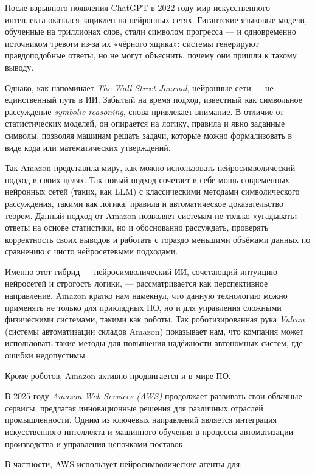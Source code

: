 После взрывного появления ChatGPT в 2022 году мир искусственного интеллекта оказался зациклен на нейронных сетях. Гигантские языковые модели, обученные на триллионах слов, стали символом прогресса — и одновременно источником тревоги из-за их «чёрного ящика»: системы генерируют правдоподобные ответы, но не могут объяснить, почему они пришли к такому выводу.

Однако, как напоминает \textit{The Wall Street Journal}, нейронные сети — не единственный путь в ИИ. Забытый на время подход, известный как символьное рассуждение \textit{symbolic reasoning}, снова привлекает внимание. В отличие от статистических моделей, он опирается на логику, правила и явно заданные символы, позволяя машинам решать задачи, которые можно формализовать в виде кода или математических утверждений.

Так Amazon представила миру, как можно использовать нейросимволический подход в своих целях. Так новый подход сочетает в себе мощь современных нейронных сетей (таких, как LLM) с классическими методами символического рассуждения, такими как логика, правила и автоматическое доказательство теорем. Данный подход от Amazon позволяет системам не только «угадывать» ответы на основе статистики, но и обоснованно рассуждать, проверять корректность своих выводов и работать с гораздо меньшими объёмами данных по сравнению с чисто нейросетевыми подходами.

Именно этот гибрид — нейросимволический ИИ, сочетающий интуицию нейросетей и строгость логики, — рассматривается как перспективное направление. Amazon кратко нам намекнул, что данную технологию можно применять не только для прикладных ПО, но и для управления сложными физическими системами, такими как роботы. Так роботизированная рука \textit{Vulcan} (системы автоматизации складов Amazon) показывает нам, что компания может использовать такие методы для повышения надёжности автономных систем, где ошибки недопустимы.

Кроме роботов, Amazon активно продвигается и в мире ПО.

В 2025 году \textit{Amazon Web Services (AWS)} продолжает развивать свои облачные сервисы, предлагая инновационные решения для различных отраслей промышленности. Одним из ключевых направлений является интеграция искусственного интеллекта и машинного обучения в процессы автоматизации производства и управления цепочками поставок. 

В частности, AWS использует нейросимволические агенты для:

